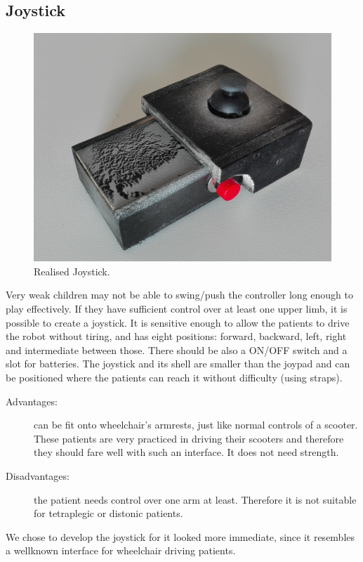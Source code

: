 \documentclass[a4paper,twoside]{book}
\begin{document}
\subsection{Joystick}

\begin{figure}[h]
\centering
\includegraphics[width=0.8\linewidth]{img/IMG_20160613_153916_1} 
\caption{Realised Joystick.}
\end{figure}

\beforelist* Very weak children may not be able to swing/push the controller long enough to play effectively. If they have sufficient control over at least one upper limb, it is possible to create a joystick.
It is sensitive enough to allow the patients to drive the robot without tiring, and has eight positions: forward, backward, left, right and
intermediate between those.
There should be also a ON/OFF switch and a slot for batteries.
The joystick and its shell are smaller than the joypad and can be positioned where the patients can reach it without difficulty (using straps).
\begin{description}
\item[Advantages:] can be fit onto wheelchair's armrests, just like normal controls of a scooter. These patients are very practiced in driving their scooters and therefore they should fare well with such an interface. It does not need strength.
\item[Disadvantages:] the patient needs control over one arm at least. Therefore it is not suitable for tetraplegic or distonic patients.
\end{description}
\afterlist*
We chose to develop the joystick for it looked more immediate, since it resembles a well\textendash known interface for wheelchair driving patients.
\end{document}

